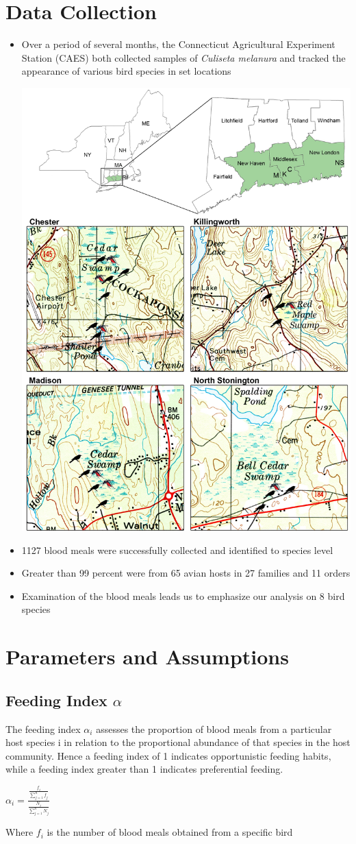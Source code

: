 \documentclass[portrait]{sciposter}
\begin{document}
\begin{multicols}{2}
\section*{Data Collection}
\begin{itemize}
\item Over a period of several months, the Connecticut Agricultural Experiment Station (CAES) both collected samples of \textit{Culiseta melanura} and tracked the appearance of various bird species in set locations
\begin{center}
\includegraphics[width=.25\linewidth]{figs/EEESitefig}
\end{center}
\item 1127 blood meals were successfully collected and identified to species level
\item Greater than 99 percent were from 65 avian hosts in 27 families and 11 orders
\item Examination of the blood meals leads us to emphasize our analysis on 8  bird species
\end{itemize}

\section*{Parameters and Assumptions}
\subsection*{Feeding Index $\alpha$}
The feeding index $\alpha_i$ assesses the proportion of blood meals from a particular host species i in relation to the proportional abundance of that species in the host community.  Hence a feeding index of 1 indicates opportunistic feeding habits, while a feeding index greater than 1 indicates preferential feeding. \\
\begin{center}
\huge $\alpha_i= \frac{\frac{f_i}{\sum\limits_{j=1}^nf_j}}{\frac{N_i}{\sum\limits_{j=1}^nN_j}}$ 
\end{center}
Where $f_i$ is the number of blood meals obtained from a specific bird


\end{multicols}
\end{document}
